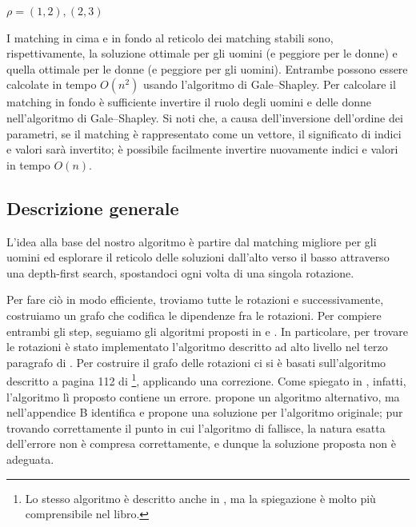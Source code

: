 \documentclass[12pt]{article}
\begin{document}
    \begin{center}
        $\rho = (1, 2), (2, 3)$    
    \end{center}

    I matching in cima e in fondo al reticolo dei matching stabili sono, rispettivamente, la soluzione ottimale per gli uomini (e peggiore per le donne) e quella ottimale per le donne (e peggiore per gli uomini). Entrambe possono essere calcolate in tempo $O(n^2)$ usando l'algoritmo di Gale–Shapley.\cite{GaleShapley} Per calcolare il matching in fondo è sufficiente invertire il ruolo degli uomini e delle donne nell'algoritmo di Gale–Shapley. Si noti che, a causa dell'inversione dell'ordine dei parametri, se il matching è rappresentato come un vettore, il significato di indici e valori sarà invertito; è possibile facilmente invertire nuovamente indici e valori in tempo $O(n)$.

    \subsection{Descrizione generale}
    \label{DescrizioneGeneraleSeriale}
    L'idea alla base del nostro algoritmo è partire dal matching migliore per gli uomini ed esplorare il reticolo delle soluzioni dall'alto verso il basso attraverso una depth-first search, spostandoci ogni volta di una singola rotazione.
    
    Per fare ciò in modo efficiente, troviamo tutte le rotazioni e successivamente, costruiamo un grafo che codifica le dipendenze fra le rotazioni. Per compiere entrambi gli step, seguiamo gli algoritmi proposti in \cite{Gusfield3FastAlg} e \cite{GusfieldBook}. In particolare, per trovare le rotazioni è stato implementato l'algoritmo descritto ad alto livello nel terzo paragrafo di \cite{Gusfield3FastAlg}. Per costruire il grafo delle rotazioni ci si è basati sull'algoritmo descritto a pagina 112 di \cite{GusfieldBook}\footnote{Lo stesso algoritmo è descritto anche in \cite{Gusfield3FastAlg}, ma la spiegazione è molto più comprensibile nel libro.}, applicando una correzione. Come spiegato in \cite{cai2019representing}, infatti, l'algoritmo lì proposto contiene un errore. \cite{cai2019representing} propone un algoritmo alternativo, ma nell'appendice B identifica e propone una soluzione per l'algoritmo originale; pur trovando correttamente il punto in cui l'algoritmo di \cite{GusfieldBook} fallisce, la natura esatta dell'errore non è compresa correttamente, e dunque la soluzione proposta non è adeguata.
\end{document}
